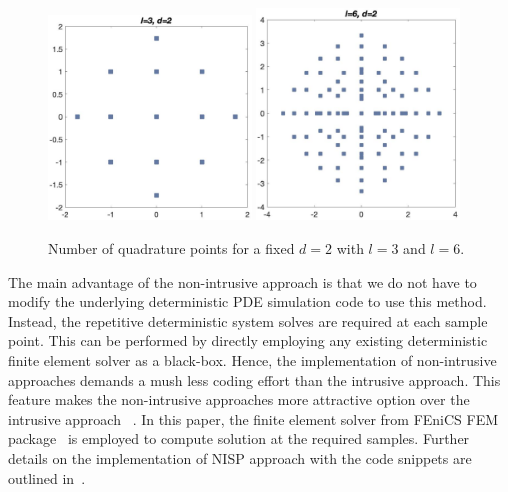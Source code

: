 \documentclass[letter,1p,11pt,oneside,onecolumn,sort&compress]{elsarticle}
\begin{document}
\begin{figure}[htbp]
\centering
 \includegraphics[width=0.48\textwidth,height=0.24\textheight]{plots/sparseGrid_D2L3.eps}
 \includegraphics[width=0.48\textwidth,height=0.24\textheight]{plots/sparseGrid_D2L6.eps}
 \caption{Number of quadrature points for a fixed $d=2$ with $l=3$ and $l=6$.}
 \label{fig:sparseGrid}
\end{figure}

The main advantage of the non-intrusive approach is that we do not have to modify the underlying deterministic PDE simulation code to use this method. Instead, the repetitive deterministic system solves are required at each sample point. This can be performed by directly employing any existing deterministic finite element solver as a black-box. Hence, the implementation of non-intrusive approaches demands a mush less coding effort than the intrusive approach. This feature makes the non-intrusive approaches more attractive option over the intrusive approach
~\cite{eldred2009comparison,elman2011assessment,tipireddy2010comparison,back2011stochastic,desai2010analysis}.
In this paper, the finite element solver from FEniCS FEM package~\cite{logg2012FEniCS,aloggs2013puffin} is employed to compute solution at the required samples. Further details on the implementation of NISP approach with the code snippets are outlined in~.
\end{document}

